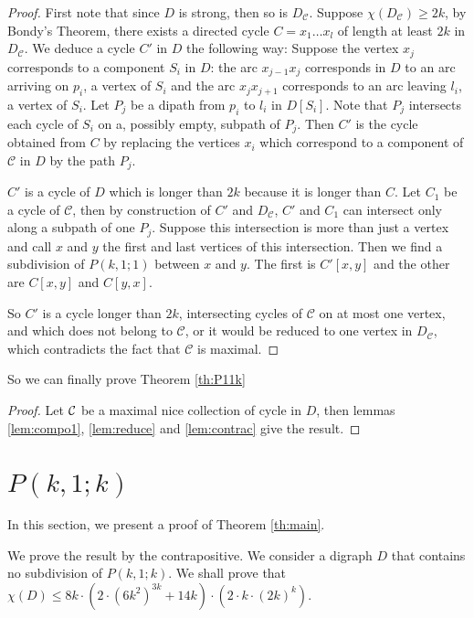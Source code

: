 \documentclass[utf8,10pt]{article}
\theoremstyle{plain}
\theoremstyle{definition}
\theoremstyle{remark}
\newcommand{\cste}{ 8k \cdot (2\cdot \col + 14k) \cdot (2 \cdot \dr)}
\newcommand{\dr}{ k \cdot (2k)^k}
\newcommand{\col}{(6k^2)^{3k}}
\begin{document}
\begin{proof}
First note that since $D$ is strong, then so is $D_{\mathcal{C}}$. Suppose $\chi(D_{\mathcal{C}}) \geq 2k$, by Bondy's Theorem, there exists a directed cycle
$C = x_1\dots x_l$ of length at least $2k$ in $ D_{\mathcal{C}}$. We deduce a cycle $C'$ in $D$ the following way:
Suppose the vertex $x_j$ corresponds to a component $S_i$ in $D$: the arc $x_{j-1}x_j$ corresponds in $D$ to an arc arriving on 
$p_i$, a vertex of $S_i$ and the arc $x_jx_{j+1}$ corresponds to an arc leaving $l_i$, a vertex of $S_i$. Let $P_j$ be a dipath 
from $p_i$ to $l_i$ in $D[S_i]$. Note that $P_j$ intersects each cycle of $S_i$ on a, possibly empty, subpath of $P_j$. 
Then $C'$ is the cycle obtained from $C$ by replacing the vertices $x_i$ which correspond to a component of $\mathcal{C}$ in $D$ by the path $P_j$.

$C'$ is a cycle of $D$ which is longer than $2k$ because it is longer than $C$. Let $C_1$ be a cycle of $\mathcal{C}$, then by construction of $C'$ 
and $D_{\mathcal{C}}$, $C'$ and $C_1$ can intersect only along a subpath of one $P_j$. Suppose this intersection is more than just a vertex and call $x$ and
$y$ the first and last vertices of this intersection. Then we find a subdivision of $P(k,1;1)$ between $x$ and $y$. The first is $C'[x,y]$ and the other are
$C[x,y]$ and $C[y,x]$.

So $C'$ is a cycle longer than $2k$, intersecting cycles of $\mathcal{C}$ on at most one vertex, and which does not belong to $\mathcal{C}$, or it would be reduced
to one vertex in $D_{\mathcal{C}}$, which contradicts the fact that $\mathcal{C}$ is maximal.
\end{proof}

So we can finally prove Theorem \ref{th:P11k}

\begin{proof}
Let ${\cal C}$ be a maximal nice collection of cycle in $D$, then lemmas \ref{lem:compo1}, \ref{lem:reduce} and \ref{lem:contrac} give the result.
\end{proof}


\section{$P(k,1;k)$}\label{sec:main}

In this section, we present a proof of Theorem \ref{th:main}.

We prove the result by the contrapositive. We consider a digraph $D$ that contains no subdivision of $P(k,1;k)$.
We shall prove that $\chi(D) \leq \cste$.
\end{document}
